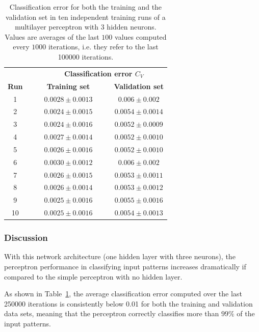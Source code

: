 \documentclass[12pt,titlepage]{article}
\begin{document}
\begin{table}[htbp]
\centering
\begin{tabular}{ccccc}
\toprule
   &  $\quad $ & \multicolumn{3}{c}{\textbf{Classification error $C_V$}}\\
\cmidrule{3-5}
\textbf{Run} & & \textbf{Training set}  &  $\quad $ & \textbf{Validation set}\\
\midrule
1 & &  $0.0028 \pm 0.0013$  & & $0.006 \pm 0.002$ \\
2 & &  $0.0024 \pm 0.0015$  & & $0.0054 \pm 0.0014$ \\
3 & &  $0.0024 \pm 0.0016$  & & $0.0052 \pm 0.0009$ \\
4 & &  $0.0027 \pm 0.0014$  & & $0.0052 \pm 0.0010$ \\
5 & &  $0.0026 \pm 0.0016$  & & $0.0052 \pm 0.0010$ \\
6 & &  $0.0030 \pm 0.0012$  & & $0.006 \pm 0.002$ \\
7 & &  $0.0026 \pm 0.0015$  & & $0.0053 \pm 0.0011$ \\
8 & &  $0.0026 \pm 0.0014$  & & $0.0053 \pm 0.0012$ \\
9 & &  $0.0025 \pm 0.0016$  & & $0.0055 \pm 0.0016$ \\
10 & &  $0.0025 \pm 0.0016$  & & $0.0054 \pm 0.0013$ \\
\bottomrule
\end{tabular}
\caption{\footnotesize Classification error for both the training and the validation set in ten independent training runs of a multilayer perceptron with 3 hidden neurons. Values are averages of the last $100$ values computed every $1000$ iterations, i.e. they refer to the last 100000 iterations.}
\label{tab:2c}
\end{table}

\subsubsection*{Discussion}

With this network architecture (one hidden layer with three neurons), the perceptron performance in classifying input patterns increases dramatically if compared to the simple perceptron with no hidden layer. 

As shown in Table~\ref{tab:2c}, the average classification error computed over the last 250000 iterations is consistently below 0.01 for both the training and validation data sets, meaning that the perceptron correctly classifies more than $99\%$ of the input patterns.
\end{document}

